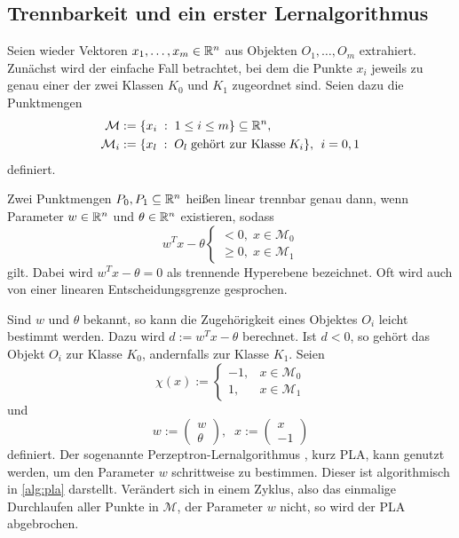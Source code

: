 \subsection{Trennbarkeit und ein erster Lernalgorithmus}
\label{abs:trenn}
Seien wieder Vektoren $x_1, \ldots, x_m \in \mathbb{R}^{n}$ aus Objekten $O_1, \ldots, O_m$ extrahiert. Zunächst wird der einfache Fall betrachtet, bei dem die Punkte $x_i$ jeweils zu genau einer der zwei Klassen $K_0$ und $K_{1}$ zugeordnet sind. Seien dazu die Punktmengen
\begin{align*}
    \mathcal{M} & :=\{x_i \; : \; 1 \leq i \leq m\} \subseteq \mathbb{R}^{n}, \\
    \mathcal{M}_i &:=\{x_l \; : \; O_l \; \text{gehört zur Klasse} \; K_i\}, \; \, i=0,1
\end{align*}
definiert.

\begin{defi}
    Zwei Punktmengen $P_0, P_{1} \subseteq \mathbb{R}^n$ heißen linear trennbar genau dann, wenn Parameter $w \in \mathbb{R}^n$ und $\theta \in \mathbb{R}^n$ existieren, sodass
    \begin{equation*}
        w^T x - \theta \begin{cases}
            <0, \; x \in \mathcal{M}_{0} \\
            \geq 0, \; x \in \mathcal{M}_1
        \end{cases}
    \end{equation*}
    gilt. Dabei wird $w^T x- \theta=0$ als trennende Hyperebene bezeichnet. Oft wird auch von einer linearen Entscheidungsgrenze gesprochen.
\end{defi}
Sind $w$ und $\theta$ bekannt, so kann die Zugehörigkeit eines Objektes $O_i$ leicht bestimmt werden. Dazu wird $d:=w^T x -\theta$ berechnet. Ist $d<0$, so gehört das Objekt $O_i$ zur Klasse $K_0$, andernfalls zur Klasse $K_1$. Seien 
\begin{equation*}
    \chi(x):= \begin{cases}
        -1,  &x \in \mathcal{M}_0 \\
        1,  &x \in \mathcal{M}_1
    \end{cases}
\end{equation*}
und \begin{equation*}
    w:= \begin{pmatrix}
    w \\
    \theta    
    \end{pmatrix}, \; \; x:=\begin{pmatrix}
        x \\
        -1
    \end{pmatrix} 
\end{equation*}
definiert.
Der sogenannte Perzeptron-Lernalgorithmus \cite{rosenblatt1958perceptron}, kurz PLA, kann genutzt werden, um den Parameter $w$ schrittweise zu bestimmen. Dieser ist algorithmisch in \ref{alg:pla} darstellt. Verändert sich in einem Zyklus, also das einmalige Durchlaufen aller Punkte in $\mathcal{M}$, der Parameter $w$ nicht, so wird der PLA abgebrochen.


